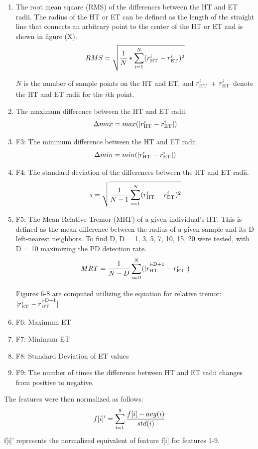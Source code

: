\documentclass[pmlr,twocolumn,10pt]{jmlr} %
\let\SUP\textsuperscript
\newcommand\red[1]{{\color{red}#1}}
\begin{document}
\begin{enumerate}
\item The root mean square (RMS) of the differences between the HT and ET radii. The radius of the HT or ET can be defined as the length of the straight line that connects an arbitrary point to the center of the HT or ET and is shown in figure (X). 
\[RMS = \sqrt{\frac{1}{N} * \sum_\SUP{i=1}^N(r_\SUP{HT}^i - r_\SUP{ET}^i)^2}\]

$N$ is the number of sample points on the HT and ET, and $r_\SUP{HT}^i$ + $r_\SUP{ET}^i$ denote the HT and ET radii for the $i$th point.

\item The maximum difference between the HT and ET radii. 
\[\Delta max = max(|r_\SUP{HT}^i - r_\SUP{ET}^i|)\]

\item F3: The minimum difference between the HT and ET radii. 
\[\Delta min = min(|r_\SUP{HT}^i - r_\SUP{ET}^i|)\]

\item F4: The standard deviation of the differences between the HT and ET radii. 
\[s = \sqrt{\frac{1}{N-1}\sum_{i=1}^N(r_\SUP{HT}^i - r_\SUP{ET}^i)^2}\]

\item F5: The Mean Relative Tremor (MRT) of a given individual’s HT. This is defined as the mean difference between the radius of a given sample and its D left-nearest neighbors. To find D, D = {1, 3, 5, 7, 10, 15, 20} were tested, with D = 10 maximizing the PD detection rate. 
\[MRT = \frac{1}{N-D}\sum_\SUP{i=D}^N(|r_\SUP{HT}^\SUP{i-D+1} - r_\SUP{ET}^i|)\]

Figures 6-8 are computed utilizing the equation for relative tremor: $|r_\SUP{ET}^i - r_\SUP{HT}^\SUP{i-D+1}|$
\item F6: Maximum ET
\item F7: Minimum ET
\item F8: Standard Deviation of ET values
\item F9: The number of times the difference between HT and ET radii changes from positive to negative.
\end{enumerate}

The features were then normalized as follows:
\[f[i]' = \sum_\SUP{i=1}^9\frac{f[i] - avg(i)}{std(i)}\]
f[i]' represents the normalized equivalent of feature f[i] for features 1-9.
\end{document}
